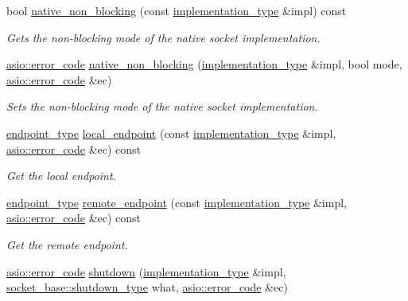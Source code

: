 \begin{DoxyCompactItemize}
bool \hyperlink{classasio_1_1seq__packet__socket__service_a64e0369ec8d94781326c7382bbd57ffd}{native\+\_\+non\+\_\+blocking} (const \hyperlink{classasio_1_1seq__packet__socket__service_a6e1d2027450d7a5d8ea7896a3de0c8ff}{implementation\+\_\+type} \&impl) const 
\begin{DoxyCompactList}\small\item\em Gets the non-\/blocking mode of the native socket implementation. \end{DoxyCompactList}\item 
\hyperlink{classasio_1_1error__code}{asio\+::error\+\_\+code} \hyperlink{classasio_1_1seq__packet__socket__service_af9aab15e7d3c491128c0a96a0bff36f3}{native\+\_\+non\+\_\+blocking} (\hyperlink{classasio_1_1seq__packet__socket__service_a6e1d2027450d7a5d8ea7896a3de0c8ff}{implementation\+\_\+type} \&impl, bool mode, \hyperlink{classasio_1_1error__code}{asio\+::error\+\_\+code} \&ec)
\begin{DoxyCompactList}\small\item\em Sets the non-\/blocking mode of the native socket implementation. \end{DoxyCompactList}\item 
\hyperlink{classasio_1_1seq__packet__socket__service_ade8f7b83e2a45da7bbdc473deaf25075}{endpoint\+\_\+type} \hyperlink{classasio_1_1seq__packet__socket__service_ac1e2a6fe49dfb40f141bc5519705e3ef}{local\+\_\+endpoint} (const \hyperlink{classasio_1_1seq__packet__socket__service_a6e1d2027450d7a5d8ea7896a3de0c8ff}{implementation\+\_\+type} \&impl, \hyperlink{classasio_1_1error__code}{asio\+::error\+\_\+code} \&ec) const 
\begin{DoxyCompactList}\small\item\em Get the local endpoint. \end{DoxyCompactList}\item 
\hyperlink{classasio_1_1seq__packet__socket__service_ade8f7b83e2a45da7bbdc473deaf25075}{endpoint\+\_\+type} \hyperlink{classasio_1_1seq__packet__socket__service_a043a5af10cea8c391d8c1aee974e9b69}{remote\+\_\+endpoint} (const \hyperlink{classasio_1_1seq__packet__socket__service_a6e1d2027450d7a5d8ea7896a3de0c8ff}{implementation\+\_\+type} \&impl, \hyperlink{classasio_1_1error__code}{asio\+::error\+\_\+code} \&ec) const 
\begin{DoxyCompactList}\small\item\em Get the remote endpoint. \end{DoxyCompactList}\item 
\hyperlink{classasio_1_1error__code}{asio\+::error\+\_\+code} \hyperlink{classasio_1_1seq__packet__socket__service_a2837968f12fd40738be790a4b1c97c7d}{shutdown} (\hyperlink{classasio_1_1seq__packet__socket__service_a6e1d2027450d7a5d8ea7896a3de0c8ff}{implementation\+\_\+type} \&impl, \hyperlink{classasio_1_1socket__base_a915e52ff147efd296350bba81f795c37}{socket\+\_\+base\+::shutdown\+\_\+type} what, \hyperlink{classasio_1_1error__code}{asio\+::error\+\_\+code} \&ec)

\end{DoxyCompactItemize}
